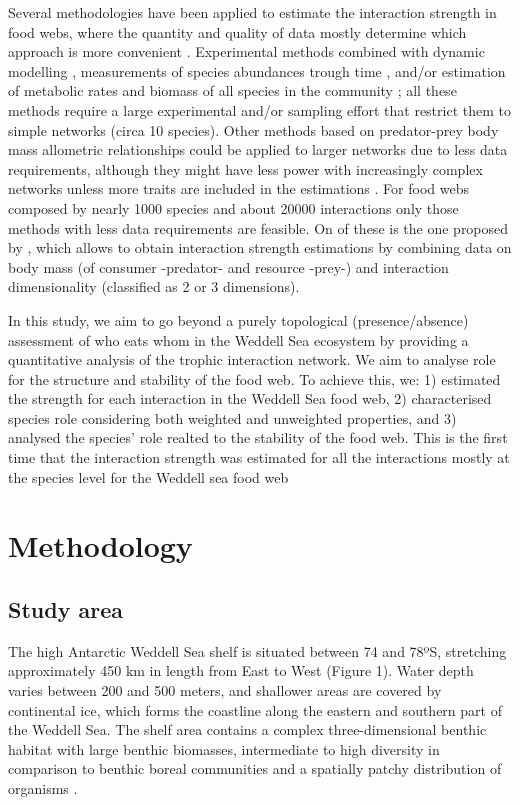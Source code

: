 \documentclass[gc, manuscript]{copernicus}
\begin{document}
Several methodologies have been applied to estimate the interaction
strength in food webs, where the quantity and quality of data mostly
determine which approach is more convenient \citep{Berlow2004}.
Experimental methods combined with dynamic modelling
\citep{Emmerson2004, Carrara2015}, measurements of species abundances
trough time \citep{Fahimipour2014, Chang2021}, and/or estimation of
metabolic rates and biomass of all species in the community
\citep{Neutel2014}; all these methods require a large experimental
and/or sampling effort that restrict them to simple networks (circa 10
species). Other methods based on predator-prey body mass allometric
relationships \citep{Berlow2009, Pawar2012} could be applied to larger
networks due to less data requirements, although they might have less
power with increasingly complex networks unless more traits are included
in the estimations \citep{Jonsson2018}. For food webs composed by nearly
1000 species and about 20000 interactions only those methods with less
data requirements are feasible. On of these is the one proposed by
\citet{Pawar2012}, which allows to obtain interaction strength
estimations by combining data on body mass (of consumer -predator- and
resource -prey-) and interaction dimensionality (classified as 2 or 3
dimensions).

In this study, we aim to go beyond a purely topological
(presence/absence) assessment of who eats whom in the Weddell Sea
ecosystem by providing a quantitative analysis of the trophic
interaction network. We aim to analyse role for the structure and
stability of the food web. To achieve this, we: 1) estimated the
strength for each interaction in the Weddell Sea food web, 2)
characterised species role considering both weighted and unweighted
properties, and 3) analysed the species' role realted to the stability
of the food web. This is the first time that the interaction strength
was estimated for all the interactions mostly at the species level for
the Weddell sea food web

\section{Methodology}

\subsection{Study area}

The high Antarctic Weddell Sea shelf is situated between 74 and 78ºS,
stretching approximately 450 km in length from East to West (Figure 1).
Water depth varies between 200 and 500 meters, and shallower areas are
covered by continental ice, which forms the coastline along the eastern
and southern part of the Weddell Sea. The shelf area contains a complex
three-dimensional benthic habitat with large benthic biomasses,
intermediate to high diversity in comparison to benthic boreal
communities and a spatially patchy distribution of organisms
\citep{Dayton1990, Teixido2002}.
\end{document}
